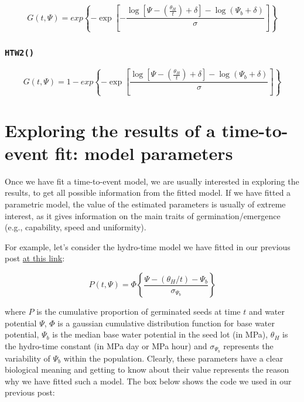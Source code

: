 \documentclass[
]{book}
\begin{document}
\[ G(t, \Psi) = exp \left\{ - \exp \left[ - \frac{ \log \left[ \Psi  - \left( \frac{\theta _H}{t} \right) + \delta \right] - \log(\Psi_{b} + \delta)  }{\sigma}\right] \right\}\]

\hypertarget{htw2}{%
\subsection{\texorpdfstring{\texttt{HTW2()}}{HTW2()}}\label{htw2}}

\[ G(t, \Psi) = 1 - exp \left\{ - \exp \left[ \frac{ \log \left[ \Psi  - \left( \frac{\theta _H}{t} \right) + \delta \right] - \log(\Psi_{b} + \delta)  }{\sigma}\right] \right\}\]

\hypertarget{exploring-the-results-of-a-time-to-event-fit-model-parameters}{%
\chapter{Exploring the results of a time-to-event fit: model parameters}\label{exploring-the-results-of-a-time-to-event-fit-model-parameters}}

Once we have fit a time-to-event model, we are usually interested in exploring the results, to get all possible information from the fitted model. If we have fitted a parametric model, the value of the estimated parameters is usually of extreme interest, as it gives information on the main traits of germination/emergence (e.g., capability, speed and uniformity).

For example, let's consider the hydro-time model we have fitted in our previous post \href{https://www.statforbiology.com/2022/stat_drcte_6-ht1step/}{at this link}:

\[ P(t, \Psi) = \Phi \left\{ \frac{\Psi - (\theta_H / t) -\Psi_b }{\sigma_{\Psi_b}} \right\}\]

where \(P\) is the cumulative proportion of germinated seeds at time \(t\) and water potential \(\Psi\), \(\Phi\) is a gaussian cumulative distribution function for base water potential, \(\Psi_{b}\) is the median base water potential in the seed lot (in MPa), \(\theta_H\) is the hydro-time constant (in MPa day or MPa hour) and \(\sigma_{\Psi_b}\) represents the variability of \(\Psi_b\) within the population. Clearly, these parameters have a clear biological meaning and getting to know about their value represents the reason why we have fitted such a model. The box below shows the code we used in our previous post:
\end{document}

